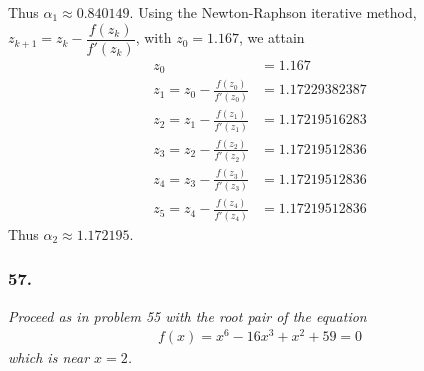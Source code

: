 \documentclass[12pt]{article}
\begin{document}
Thus $\alpha_1 \approx 0.840149$.  Using the Newton-Raphson iterative method, $z_{k+1} = z_k - \dfrac{f(z_k)}{f'(z_k)}$, with $z_0 = 1.167$, we attain
\begin{align*}
z_0 &= 1.167 \\
z_1 = z_0 - \frac{f(z_0)}{f'(z_0)} &= 1.17229382387 \\
z_2 = z_1 - \frac{f(z_1)}{f'(z_1)} &=  1.17219516283 \\
z_3 = z_2 - \frac{f(z_2)}{f'(z_2)} &=  1.17219512836 \\
z_4 = z_3 - \frac{f(z_3)}{f'(z_3)} &=  1.17219512836 \\
z_5 = z_4 - \frac{f(z_4)}{f'(z_4)} &=  1.17219512836
\end{align*}
Thus $\alpha_2 \approx 1.172195$.

\subsubsection*{57.}

{\it Proceed as in problem 55 with the root pair of the equation}
\begin{align*}
f(x) = x^6 - 16x^3 + x^2 + 59 = 0
\end{align*}
{\it which is near $x = 2$.} \\
\end{document}

